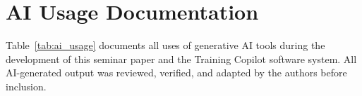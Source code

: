 \section*{AI Usage Documentation}
\label{sec:ai_usage}

\vspace{0.3cm}

Table~\ref{tab:ai_usage} documents all uses of generative AI tools during the development of this seminar paper and the Training Copilot software system. All AI-generated output was reviewed, verified, and adapted by the authors before inclusion.

\vspace{0.3cm}


